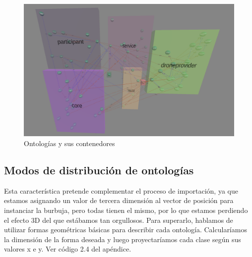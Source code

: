 \begin{figure}[ht]
   \begin{center}
      \includegraphics[width=0.8\linewidth]{chapter2/figures/ontologies&containers.png}
   \end{center}
   \caption[Ontologías y sus contenedores]
   {\footnotesize Ontologías y sus contenedores}
   \label{fig:mufigure17}
\end{figure}

\subsection{Modos de distribución de ontologías}

Esta característica pretende complementar el proceso de importación, ya que estamos asignando un valor de tercera dimensión al vector de posición para instanciar la burbuja, pero todas tienen el mismo, por lo que estamos perdiendo el efecto 3D del que estábamos tan orgullosos. Para superarlo, hablamos de utilizar formas geométricas básicas para describir cada ontología.
Calcularíamos la dimensión de la forma deseada y luego proyectaríamos cada clase según sus valores x e y. Ver código 2.4 del apéndice.

